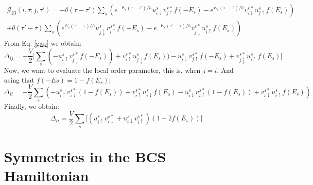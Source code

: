 \documentclass[letterpaper,12pt]{article}
\begin{document}
\begin{equation}
\begin{split}
    \mathcal{G}_{23}(i, \tau; j, \tau') = - \theta(\tau - \tau')\sum_{s} (e^{-E_s(\tau - \tau')/\hbar} u_{i\downarrow}^s v_{j\uparrow}^{s*}f(-E_s) - e^{E_s(\tau - \tau')/\hbar}v_{i\downarrow}^{s*}u_{j\uparrow}^{s}f(E_s))\\
    + \theta(\tau' - \tau)\sum_{s} (e^{E_s(\tau' - \tau)/\hbar} u_{j\downarrow}^{s}v_{i\uparrow}^{s*}f(-E_s) - e^{-E_s(\tau' - \tau)/\hbar}v_{j\downarrow}^{s*}u_{i\uparrow}^{s}f(E_s))
\end{split}
\end{equation}
From Eq. \ref{gap} we obtain:
\begin{equation}
    \Delta_{ij} = -\frac{V}{2}\big[\sum_s (-u_{i\uparrow}^s v_{j\downarrow}^{s*}f(-E_s)) + v_{i\uparrow}^{s*}u_{j\downarrow}^{s}f(E_s)) - u_{i\downarrow}^s v_{j\uparrow}^{s*}f(-E_s) + v_{j\downarrow}^{s*}u_{i\uparrow}^{s}f(E_s) \big]
\end{equation}
Now, we want to evaluate the local order parameter, this is, when $j = i$. And using that $f(-Es) = 1 - f(E_s)$: 
\begin{equation*}
    \Delta_{ii} = -\frac{V}{2}\sum_s (-u_{i\uparrow}^s v_{i\downarrow}^{s*}(1 - f(E_s)) + v_{i\uparrow}^{s*}u_{i\downarrow}^{s}f(E_s) - u_{i\downarrow}^s v_{i\uparrow}^{s*}(1 - f(E_s)) + v_{i\downarrow}^{s*}u_{i\uparrow}^{s}f(E_s)) 
\end{equation*}
Finally, we obtain:
\begin{equation}
    \Delta_{ii} = \frac{V}{2}\sum_s\Big[(u_{i\uparrow}^s v_{i\downarrow}^{s*} + u_{i\downarrow}^s v_{i\uparrow}^{s*})(1 - 2f(E_s))\Big]
\end{equation}

\clearpage

\section{Symmetries in the BCS Hamiltonian}
\end{document}
